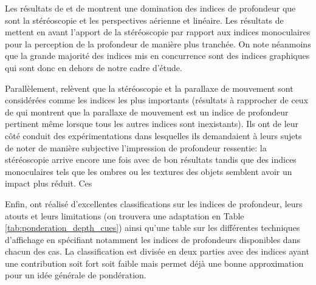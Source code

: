 \par Les résultats de \cite{mazur_relative_1990} et de \cite{surdick_relevant_1994} montrent une domination des indices de profondeur que sont la stéréoscopie et les perspectives aérienne et linéaire. Les résultats de \cite{reinhart_comparison_1990} mettent en avant l'apport de la stéréoscopie par rapport aux indices monoculaires pour la perception de la profondeur de manière plus tranchée. On note néanmoins que la grande majorité des indices mis en concurrence sont des indices graphiques qui sont donc en dehors de notre cadre d'étude.

\par Parallèlement, \citep{mikkola_relative_2010} relèvent que la stéréoscopie et la parallaxe de mouvement sont considérées comme les indices les plus importants (résultats à rapprocher de ceux de \citep{rogers_motion_1979} qui montrent que la parallaxe de mouvement est un indice de profondeur pertinent même lorsque tous les autres indices sont inexistants). Ils ont de leur côté conduit des expérimentations dans lesquelles ils demandaient à leurs sujets de noter de manière subjective l'impression de profondeur ressentie: la stéréoscopie arrive encore une fois avec de bon résultats tandis que des indices monoculaires tels que les ombres ou les textures des objets semblent avoir un impact plus réduit. Ces 

\par Enfin, \citep{mehrabi_making_2013} ont réalisé d'excellentes classifications sur les indices de profondeur, leurs atouts et leurs limitations (on trouvera une adaptation en Table \ref{tab:ponderation_depth_cues}) ainsi qu'une table sur les différentes techniques d'affichage en spécifiant notamment les indices de profondeurs disponibles dans chacun des cas. La classification est divisée en deux parties avec des indices ayant une contribution soit fort soit faible mais permet déjà une bonne approximation pour un idée générale de pondération.

